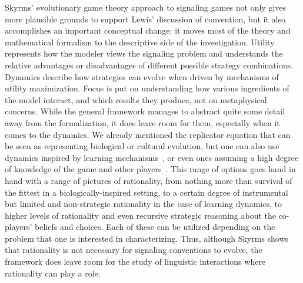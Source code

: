 \documentclass[a4paper]{article}
\begin{document}
Skyrms' evolutionary game theory approach to signaling games not only gives more plausible grounds to support Lewis' discussion of convention, but it also accomplishes an important conceptual change: it moves most of the theory and mathematical formalism to the descriptive side of the investigation.
Utility represents how the modeler views the signaling problem and understands the relative advantages or disadvantages of different possible strategy combinations.
Dynamics describe how strategies can evolve when driven by mechanisms of utility maximization.
Focus is put on understanding how various ingredients of the model interact, and which results they produce, not on metaphysical concerns.
While the general framework manages to abstract quite some detail away from the formalization, it does leave room for them, especially when it comes to the dynamics.
We already mentioned the replicator equation that can be seen as representing biological or cultural evolution, but one can also use dynamics inspired by learning mechanisms~\parencite[\emph{e.g.}][]{roth_learning_1995}, or even ones assuming a high degree of knowledge of the game and other players~\parencite[\emph{e.g.}][]{gilboa_social_1991,Muhlenbernd2011:Learning-with-N,SpikeStadler2016:Minimal-Require}.
This range of options goes hand in hand with a range of pictures of rationality, from nothing more than survival of the fittest in a biologically-inspired setting, to a certain degree of instrumental but limited and non-strategic rationality in the case of learning dynamics, to higher levels of rationality and even recursive strategic reasoning about the co-players' beliefs and choices.
Each of these can be utilized depending on the problem that one is interested in characterizing.
Thus, although Skyrms shows that rationality is not necessary for signaling conventions to evolve, the framework does leave room for the study of linguistic interactions where rationality can play a role.
\end{document}
